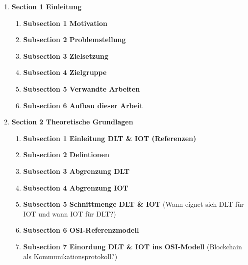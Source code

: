 \documentclass[
    ngerman,american
    ]{scrartcl}
\begin{document}
        \begin{enumerate}

            \item \textbf{Section 1 Einleitung}
                    \begin{enumerate}
                        \item \textbf{Subsection 1 Motivation}
                        \item \textbf{Subsection 2 Problemstellung}
                        \item \textbf{Subsection 3 Zielsetzung}
                        \item \textbf{Subsection 4 Zielgruppe}
                        \item \textbf{Subsection 5 Verwandte Arbeiten}
                        \item \textbf{Subsection 6 Aufbau dieser Arbeit}
                    \end{enumerate}
            \item \textbf{Section 2 Theoretische Grundlagen}
                    \begin{enumerate}
                        \item \textbf{Subsection 1 Einleitung DLT \& IOT (Referenzen)}
                        \item \textbf{Subsection 2 Defintionen}
                        \item \textbf{Subsection 3 Abgrenzung DLT}
                        \item \textbf{Subsection 4 Abgrenzung IOT}
                        \item \textbf{Subsection 5 Schnittmenge DLT \& IOT} (Wann eignet sich DLT für IOT und wann IOT für DLT?)
                        \item \textbf{Subsection 6 OSI-Referenzmodell}
                        \item \textbf{Subsection 7 Einordung DLT \& IOT ins OSI-Modell} (Blockchain als Kommunikationsprotokoll?)

\end{enumerate}
\end{enumerate}
\end{document}
